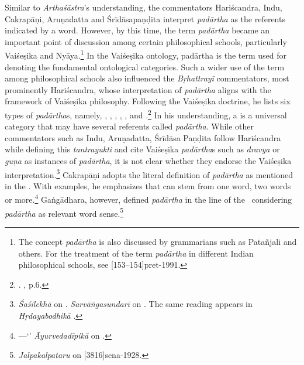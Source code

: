 Similar to \emph{Arthaśāstra}'s understanding, the commentators 
Hariścandra, Indu, Cakrapāṇi, Aruṇadatta and Śrīdāsapaṇḍita 
interpret \emph{padārtha} as the referents indicated by a word. 
However, by this time, the term \emph{padārtha} became 
an important point of discussion among certain philosophical schools, 
particularly Vaiśeṣika and Nyāya.\footnote{
	The concept \emph{padārtha} is also discussed by grammarians such as Patañjali and others. For the treatment of the term \emph{padārtha} in different Indian philosophical schools, see [153--154]{pret-1991}.} 
In the Vaiśeṣika ontology, padārtha is the term used for denoting the fundamental ontological categories. 
Such a wider use of the term among philosophical schools also influenced the \emph{Bṛhattrayī} commentators, 
most prominently Hariścandra, whose interpretation of \emph{padārtha} aligns with the framework of Vaiśeṣika philosophy. Following the Vaiśeṣika doctrine, he lists six types of \emph{padārtha}s, namely, , , , , , and .\footnote{
	. 
	, p.6.} 
In his understanding, a  is a universal category 
that may have several referents called \emph{padārtha}.
While other commentators such as 
Indu, Aruṇadatta, Śrīdāsa Paṇḍita follow Hariścandra 
while defining this \emph{tantrayukti} and
cite Vaiśeṣika \emph{padārtha}s 
such as \emph{dravya} or \emph{guṇa} as instances of \emph{padārtha}, 
it is not clear whether they endorse the Vaiśeṣika interpretation.\footnote{
		 \emph{Śaśilekhā} on .
		 \emph{Sarvāṅgasundarī} on .
		The	same reading appears in \emph{Hṛdayabodhikā} \parencite[2]{muss-1940}.} 
Cakrapāṇi adopts the literal definition of \emph{padārtha} as mentioned in the \SS. 
With examples, he emphasizes that  
can stem from one word, two words or more.\footnote{
		---‘’ 
		\emph{Āyurvedadīpikā} on .} 
Gaṅgādhara, however, defined \emph{padārtha} in the line of the \SS\ 
considering \emph{padārtha} as relevant word sense.\footnote{
		 \emph{Jalpakalpataru} on [3816]{sena-1928}.}

